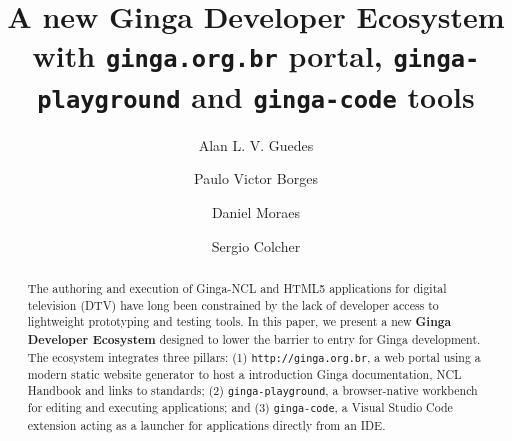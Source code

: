 \documentclass[sigconf,authorversion,review,authordraft]{webmedia}
\begin{document}
\title{A new Ginga Developer Ecosystem with \texttt{ginga.org.br} portal, \texttt{ginga-playground} and \texttt{ginga-code} tools}

\author{Alan L. V. Guedes}

\author{Paulo Victor Borges}

\author{Daniel Moraes}

\author{Sergio Colcher}

\renewcommand{\shortauthors}{Guedes et al.}

\begin{abstract}
  The authoring and execution of Ginga-NCL and HTML5 applications for digital television (DTV) have long been constrained by the lack of developer access to lightweight prototyping and testing tools. In this paper, we present a new \textbf{Ginga Developer Ecosystem} designed to lower the barrier to entry for Ginga development. The ecosystem integrates three pillars: (1) \texttt{http://ginga.org.br}, a web portal using a modern static website generator to host a introduction Ginga documentation, NCL  Handbook and links to standards; (2) \texttt{ginga-playground}, a browser-native workbench for editing and executing applications; and (3) \texttt{ginga-code}, a Visual Studio Code extension acting as a launcher for applications directly from an IDE.
\end{abstract}

\end{document}
